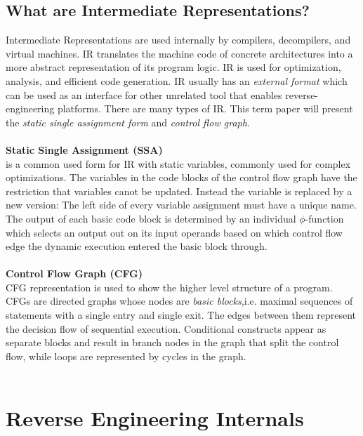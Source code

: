 \documentclass[seminar]{plai}
\begin{document}
\subsection{What are Intermediate Representations?}
\label{sec:ir-background}
Intermediate Representations are used internally by compilers, decompilers, and virtual machines.
IR  translates the machine code of concrete architectures into a more abstract representation of its program logic. IR is used for optimization, analysis, and efficient code generation.
IR usually has an \textit{external format} which can be used as an interface for other unrelated tool that enables reverse-engineering platforms.
There are many types of IR. This term paper will present the \textit{static single assignment form} and \textit{control flow graph}.\cite{introduction-to-compilers-and-language-design}\\\\
\textbf{Static Single Assignment (SSA)}\\
is a common used form for IR with static variables, commonly used for complex optimizations. The variables in the  code blocks of the control flow graph have the restriction that variables canot be updated. Instead the variable is replaced by a new version:\cite{introduction-to-compilers-and-language-design}
The left side of every variable assignment must have a unique name.
The output of each basic code block is determined by an individual $\phi$-function which selects an output out on its input operands based on which control flow edge the dynamic execution entered the basic block through.\cite{interpreting-programs-in-SSA-form}
\\\\
\textbf{Control Flow Graph (CFG)}\\
CFG representation is used to show the higher level structure of a program. CFGs are directed graphs whose nodes are \textit{basic blocks},i.e. maximal sequences of statements with a single entry and single exit. The edges between them represent the decision flow of sequential execution. Conditional constructs appear as separate blocks and result in branch nodes in the graph that split the control flow, while loops are represented by cycles in the graph.\cite{introduction-to-compilers-and-language-design}\\\\
\section{Reverse Engineering Internals}
\label{sec:reverse-engineering-internals}
\end{document}
